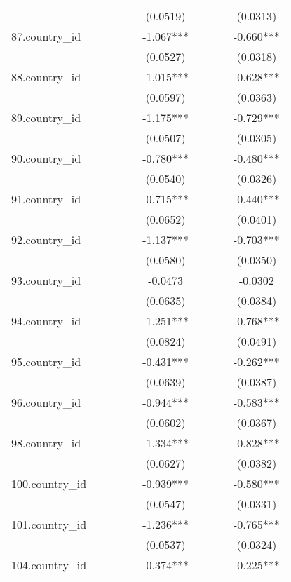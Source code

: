 \documentclass[]{article}
\begin{document}
\begin{tabular}{lccccccccc}
 &  &  &  &  & (0.0519) &  &  &  & (0.0313) \\
87.country\_id &  &  &  &  & -1.067*** &  &  &  & -0.660*** \\
 &  &  &  &  & (0.0527) &  &  &  & (0.0318) \\
88.country\_id &  &  &  &  & -1.015*** &  &  &  & -0.628*** \\
 &  &  &  &  & (0.0597) &  &  &  & (0.0363) \\
89.country\_id &  &  &  &  & -1.175*** &  &  &  & -0.729*** \\
 &  &  &  &  & (0.0507) &  &  &  & (0.0305) \\
90.country\_id &  &  &  &  & -0.780*** &  &  &  & -0.480*** \\
 &  &  &  &  & (0.0540) &  &  &  & (0.0326) \\
91.country\_id &  &  &  &  & -0.715*** &  &  &  & -0.440*** \\
 &  &  &  &  & (0.0652) &  &  &  & (0.0401) \\
92.country\_id &  &  &  &  & -1.137*** &  &  &  & -0.703*** \\
 &  &  &  &  & (0.0580) &  &  &  & (0.0350) \\
93.country\_id &  &  &  &  & -0.0473 &  &  &  & -0.0302 \\
 &  &  &  &  & (0.0635) &  &  &  & (0.0384) \\
94.country\_id &  &  &  &  & -1.251*** &  &  &  & -0.768*** \\
 &  &  &  &  & (0.0824) &  &  &  & (0.0491) \\
95.country\_id &  &  &  &  & -0.431*** &  &  &  & -0.262*** \\
 &  &  &  &  & (0.0639) &  &  &  & (0.0387) \\
96.country\_id &  &  &  &  & -0.944*** &  &  &  & -0.583*** \\
 &  &  &  &  & (0.0602) &  &  &  & (0.0367) \\
98.country\_id &  &  &  &  & -1.334*** &  &  &  & -0.828*** \\
 &  &  &  &  & (0.0627) &  &  &  & (0.0382) \\
100.country\_id &  &  &  &  & -0.939*** &  &  &  & -0.580*** \\
 &  &  &  &  & (0.0547) &  &  &  & (0.0331) \\
101.country\_id &  &  &  &  & -1.236*** &  &  &  & -0.765*** \\
 &  &  &  &  & (0.0537) &  &  &  & (0.0324) \\
104.country\_id &  &  &  &  & -0.374*** &  &  &  & -0.225*** \\

\end{tabular}
\end{document}
